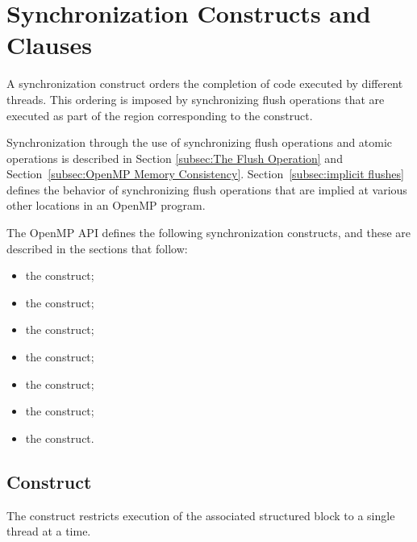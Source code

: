 \section{Synchronization Constructs and Clauses}
\label{sec:Synchronization Constructs and Clauses}
A synchronization construct orders the completion of code executed by
different threads. This ordering is imposed by synchronizing flush operations
that are executed as part of the region corresponding to the construct.

Synchronization through the use of synchronizing flush operations and atomic
operations is described in Section \ref{subsec:The Flush Operation} and
Section~\ref{subsec:OpenMP Memory Consistency}.  Section~\ref{subsec:implicit flushes}
defines the behavior of synchronizing flush operations that are
implied at various other locations in an OpenMP program.

The OpenMP API defines the following synchronization constructs, and these are
described in the sections that follow:
\begin{itemize}
\item the  construct;

\item the  construct;

\item the  construct;

\item the  construct;

\item the  construct;

\item the  construct;

\item the  construct.
\end{itemize}










\vspace{-12pt} %
\subsection{ Construct}
\label{subsec:critical Construct}
\summary
The  construct restricts execution of the associated structured block to a
single thread at a time.

